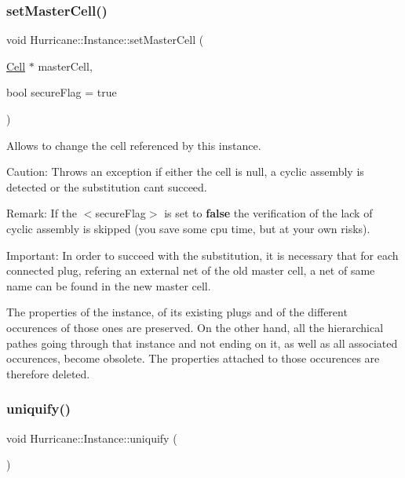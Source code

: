 \subsubsection{\texorpdfstring{set\+Master\+Cell()}{setMasterCell()}}
{\footnotesize\ttfamily void Hurricane\+::\+Instance\+::set\+Master\+Cell (\begin{DoxyParamCaption}\item[{\mbox{\hyperlink{classHurricane_1_1Cell}{Cell}} $\ast$}]{master\+Cell,  }\item[{bool}]{secure\+Flag = {\ttfamily true} }\end{DoxyParamCaption})}

Allows to change the cell referenced by this instance.

\begin{DoxyParagraph}{Caution\+: Throws an exception if either the cell is null, a cyclic }
assembly is detected or the substitution can\textquotesingle{}t succeed.
\end{DoxyParagraph}
\begin{DoxyParagraph}{Remark\+: If the {\ttfamily $<$secure\+Flag$>$} is set to {\bfseries false} the verification of }
the lack of cyclic assembly is skipped (you save some cpu time, but at your own risks).
\end{DoxyParagraph}
\begin{DoxyParagraph}{Important\+: In order to succeed with the substitution, it is necessary }
that for each connected plug, refering an external net of the old master cell, a net of same name can be found in the new master cell.
\end{DoxyParagraph}
The properties of the instance, of its existing plugs and of the different occurences of those ones are preserved. On the other hand, all the hierarchical pathes going through that instance and not ending on it, as well as all associated occurences, become obsolete. The properties attached to those occurences are therefore deleted. \mbox{\label{classHurricane_1_1Instance_adf28fcd01f6ff89c5435e83482f66d4c}} 
\subsubsection{\texorpdfstring{uniquify()}{uniquify()}}
{\footnotesize\ttfamily void Hurricane\+::\+Instance\+::uniquify (\begin{DoxyParamCaption}{ }\end{DoxyParamCaption})}

